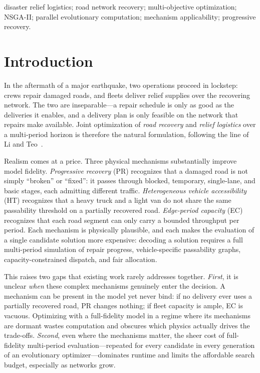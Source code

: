 \documentclass[10pt,conference,letterpaper]{IEEEtran}
\begin{document}
\begin{IEEEkeywords}
disaster relief logistics; road network recovery; multi-objective
optimization; NSGA-II; parallel evolutionary computation;
mechanism applicability; progressive recovery.
\end{IEEEkeywords}

\section{Introduction}
\label{sec:intro}

In the aftermath of a major earthquake, two operations proceed in lockstep:
crews repair damaged roads, and fleets deliver relief supplies over the
recovering network. The two are inseparable---a repair schedule is only as
good as the deliveries it enables, and a delivery plan is only feasible on
the network that repairs make available. Joint optimization of
\emph{road recovery} and \emph{relief logistics} over a multi-period
horizon is therefore the natural formulation, following the line of
Li and Teo~\cite{li2019post}.

Realism comes at a price. Three physical mechanisms substantially improve
model fidelity. \emph{Progressive recovery} (PR) recognizes that a damaged
road is not simply ``broken'' or ``fixed'': it passes through blocked,
temporary, single-lane, and basic stages, each admitting different traffic.
\emph{Heterogeneous vehicle accessibility} (HT) recognizes that a heavy
truck and a light van do not share the same passability threshold on a
partially recovered road. \emph{Edge-period capacity} (EC) recognizes that
each road segment can only carry a bounded throughput per period. Each
mechanism is physically plausible, and each makes the evaluation of a
single candidate solution more expensive: decoding a solution requires a
full multi-period simulation of repair progress, vehicle-specific
passability graphs, capacity-constrained dispatch, and fair allocation.

This raises two gaps that existing work rarely addresses together.
\emph{First}, it is unclear \emph{when} these complex mechanisms genuinely
enter the decision. A mechanism can be present in the model yet never bind:
if no delivery ever uses a partially recovered road, PR changes nothing;
if fleet capacity is ample, EC is vacuous. Optimizing with a full-fidelity
model in a regime where its mechanisms are dormant wastes computation and
obscures which physics actually drives the trade-offs. \emph{Second}, even
where the mechanisms matter, the sheer cost of full-fidelity multi-period
evaluation---repeated for every candidate in every generation of an
evolutionary optimizer---dominates runtime and limits the affordable
search budget, especially as networks grow.
\end{document}
